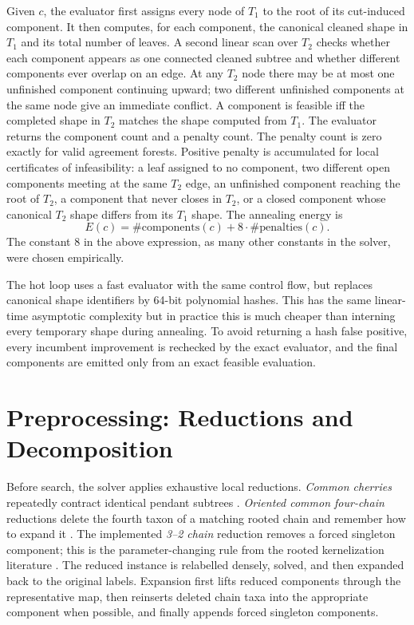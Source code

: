 \documentclass[a4paper,UKenglish,cleveref,autoref]{lipics-v2021}
\begin{document}
Given \(c\), the evaluator first assigns every node of \(T_1\) to the
root of its cut-induced component.  It then computes, for each component, the
canonical cleaned shape in \(T_1\) and its total number of leaves.  A second
linear scan over \(T_2\) checks whether each component appears as one connected
cleaned subtree and whether different components ever overlap on an edge.  At
any \(T_2\) node there may be at most one unfinished component continuing
upward; two different unfinished components at the same node give an immediate
conflict.  A component is feasible iff the completed shape in \(T_2\) matches
the shape computed from \(T_1\).  The evaluator returns the component count and
a penalty count.  The penalty count is zero exactly for valid agreement
forests.  Positive penalty is accumulated for local certificates of
infeasibility: a leaf assigned to no component, two different open components
meeting at the same \(T_2\) edge, an unfinished component reaching the root of
\(T_2\), a component that never closes in \(T_2\), or a closed component whose
canonical \(T_2\) shape differs from its \(T_1\) shape.  The annealing energy is
\[
  E(c)=\#\mathrm{components}(c)+8\cdot \#\mathrm{penalties}(c).
\]
The constant $8$ in the above expression, as many other constants in the solver,
were chosen empirically.

The hot loop uses a fast evaluator with the same control flow, but replaces
canonical shape identifiers by 64-bit polynomial hashes.  This has the same
linear-time asymptotic complexity but in practice this is much cheaper
than interning every temporary shape during annealing.  To avoid returning a
hash false positive, every incumbent improvement is rechecked by the exact
evaluator, and the final components are emitted only from an exact feasible
evaluation.

\section{Preprocessing: Reductions and Decomposition}

Before search, the solver applies exhaustive local reductions.
\emph{Common cherries} repeatedly contract identical pendant subtrees
\cite{bordewich2005,ShiFYW16,KelkLM23}.
\emph{Oriented common four-chain} reductions delete the fourth taxon 
of a matching rooted chain and remember how to expand it
\cite{bordewich2005,KelkLM23}.
The implemented \emph{3--2 chain} reduction removes a forced singleton component;
this is the parameter-changing rule from the rooted kernelization literature
\cite{KelkLM23}.  The reduced instance is relabelled densely, solved, and then
expanded back to the original labels.  Expansion first lifts reduced components
through the representative map, then reinserts deleted chain taxa into the
appropriate component when possible, and finally appends forced singleton
components.
\end{document}
